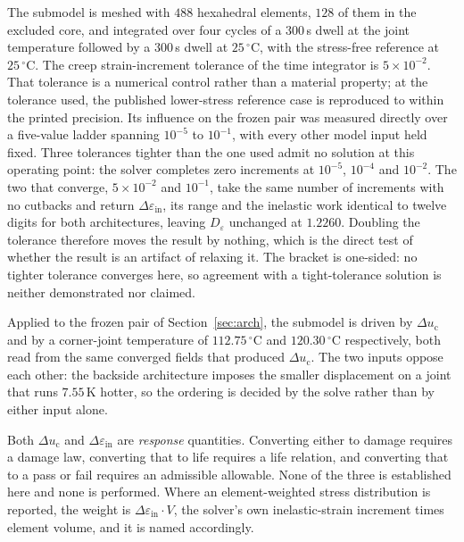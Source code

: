 \documentclass[journal]{IEEEtran}
\begin{document}
The submodel is meshed with $488$ hexahedral elements, $128$ of them in the excluded core,
and integrated over four cycles of a $300$\,s dwell at the joint temperature followed by a
$300$\,s dwell at $25\,^{\circ}$C, with the stress-free reference at $25\,^{\circ}$C. The
creep strain-increment tolerance of the time integrator is $5\times10^{-2}$. That tolerance
is a numerical control rather than a material property; at the tolerance used, the published
lower-stress reference case is reproduced to within the printed precision. Its influence on
the frozen pair was measured directly over a five-value ladder spanning $10^{-5}$ to
$10^{-1}$, with every other model input held fixed. Three tolerances tighter than the one
used admit no solution at this operating point: the solver completes zero increments at
$10^{-5}$, $10^{-4}$ and $10^{-2}$. The two that converge, $5\times10^{-2}$ and $10^{-1}$,
take the same number of increments with no cutbacks and return
$\Delta\varepsilon_{\mathrm{in}}$, its range and the inelastic work identical to twelve
digits for both architectures, leaving $D_{\varepsilon}$ unchanged at $1.2260$. Doubling the
tolerance therefore moves the result by nothing, which is the direct test of whether the
result is an artifact of relaxing it. The bracket is one-sided: no tighter tolerance
converges here, so agreement with a tight-tolerance solution is neither demonstrated nor
claimed.

Applied to the frozen pair of Section~\ref{sec:arch}, the submodel is driven by
$\Delta u_{\mathrm{c}}$ and by a corner-joint temperature of $112.75\,^{\circ}$C and
$120.30\,^{\circ}$C respectively, both read from the same converged fields that produced
$\Delta u_{\mathrm{c}}$. The two inputs oppose each other: the backside architecture imposes
the smaller displacement on a joint that runs $7.55$\,K hotter, so the ordering is decided by
the solve rather than by either input alone.

Both $\Delta u_{\mathrm{c}}$ and $\Delta\varepsilon_{\mathrm{in}}$ are \emph{response}
quantities. Converting either to damage requires a damage law, converting that to life
requires a life relation, and converting that to a pass or fail requires an admissible
allowable. None of the three is established here and none is performed. Where an
element-weighted stress distribution is reported, the weight is
$\Delta\varepsilon_{\mathrm{in}}\!\cdot\!V$, the solver's own inelastic-strain increment
times element volume, and it is named accordingly.
\end{document}
